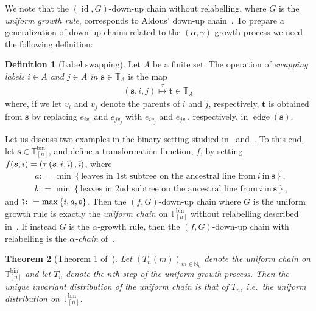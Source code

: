 \documentclass[a4paper, final]{amsart}
\theoremstyle{plain}
\newtheorem{thm}{Theorem}[section]
\theoremstyle{definition}
\newtheorem{defi}[thm]{Definition}
\newcommand{\tree}[1][t]{\boldsymbol{#1}}
\newcommand{\T}{\mathbb{T}}
\DeclareMathOperator{\edge}{edge}
\DeclareMathOperator{\id}{id}
\DeclareMathOperator{\bin}{bin}
\DeclareMathOperator{\tildei}{\tilde{\textit{\i}}}
\newcommand{\N}{\mathbb{N}}
\begin{document}
We note that the $(\id,G)$-down-up chain without relabelling, where $G$ is the \textit{uniform growth rule}, corresponds to Aldous' down-up chain~\cite{RefWorks:doc:5b4cbc14e4b04428cc72cf41}.
To prepare a generalization of down-up chains related to the $(\alpha, \gamma)$-growth process we need the following definition:
%
\begin{defi}[Label swapping]\label{def:labelswapping}
  Let $A$ be a finite set.
  The operation of \textit{swapping labels $i \in A$ and $j \in A$ in $\tree[s] \in \T_{A}$} is the map
  \begin{align*}
    \left( \tree[s], i, j \right) \stackrel{\tau}{\mapsto} \tree \in \T_A
  \end{align*}
  where, if we let $v_i$ and $v_j$ denote the parents of $i$ and $j$, respectively, $\tree$ is obtained from $\tree[s]$ by replacing $e_{iv_i}$ and $e_{jv_j}$ with $e_{iv_j}$ and $e_{jv_i}$, respectively, in $\edge (\tree[s])$.
\end{defi}
%
Let us discuss two examples in the binary setting studied in~\cite{forman2018projections} and~\cite{RefWorks:doc:5b4cbc93e4b07f5746e47014}.
To this end, let $\tree[s] \in \T_{[n]}^{\bin}$, and define a transformation function, $f$, by setting $f(\tree[s], i) = \left(\tau\left( \tree[s], i, \tildei \right), \tildei \right)$, where
\begin{align*}
  &a \colon = \min \left\{ \text{leaves in 1st subtree on the ancestral line from}\ i \ \text{in}\ \tree[s] \right\}, \nonumber \\
  &b \colon = \min \left\{ \text{leaves in 2nd subtree on the ancestral line from}\ i \ \text{in}\ \tree[s] \right\},
\end{align*}
and $\tildei \colon = \max\left\{ i, a, b \right\}$.
Then the $(f, G)$-down-up chain where $G$ is the uniform growth rule is exactly the \textit{uniform chain} on $\T_{[n]}^\text{bin}$ without relabelling described in~\cite{forman2018projections}. 
If instead $G$ is the $\alpha$-growth rule, then the $(f, G)$-down-up chain with relabelling is the \textit{$\alpha$-chain} of~\cite{RefWorks:doc:5b4cbc93e4b07f5746e47014}.
%
\begin{thm}[Theorem 1 of~\cite{RefWorks:doc:5b4cbc93e4b07f5746e47014}]
  Let ${\left( T_n(m) \right)}_{m \in \N_0}$ denote the uniform chain on $\T_{[n]}^{\bin}$ and let $T_n$ denote the $n$th step of the uniform growth process.
  Then the unique invariant distribution of the uniform chain is that of $T_n$, i.e.\ the uniform distribution on $\T_{[n]}^{\bin}$.
\end{thm}
%
%
\end{document}
